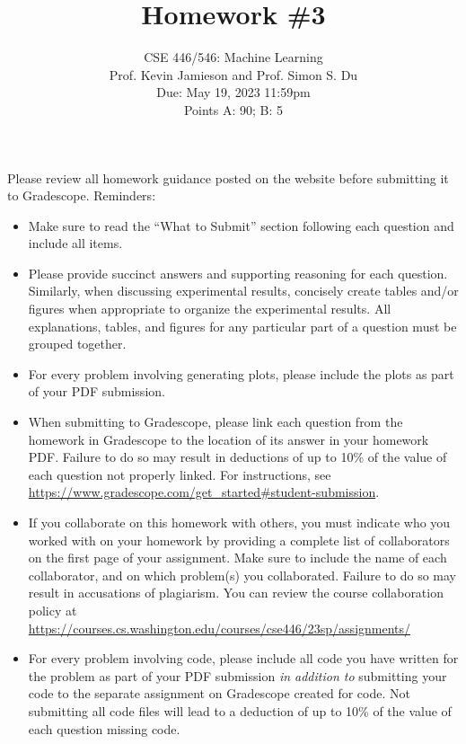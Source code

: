 \documentclass{article}
\begin{document}
\setcounter{aprob}{0}
\title{Homework \#3}
\author{
    \normalsize{CSE 446/546: Machine Learning}\\
    \normalsize{Prof. Kevin Jamieson and Prof. Simon S. Du}\\
    \normalsize{Due: May 19, 2023 11:59pm}\\
    \normalsize{Points A: 90; B: 5}
}
\date{{}}
\maketitle

\noindent Please review all homework guidance posted on the website before submitting it to Gradescope. Reminders:
\begin{itemize}
    \item Make sure to read the ``What to Submit'' section following each question and include all items.
    \item Please provide succinct answers and supporting reasoning for each question. Similarly, when discussing experimental results, concisely create tables and/or figures when appropriate to organize the experimental results. All explanations, tables, and figures for any particular part of a question must be grouped together.
    \item For every problem involving generating plots, please include the plots as part of your PDF submission.
    \item When submitting to Gradescope, please link each question from the homework in Gradescope to the location of its answer in your homework PDF. Failure to do so may result in deductions of up to 10\% of the value of each question not properly linked. For instructions, see \url{https://www.gradescope.com/get_started#student-submission}.
    \item If you collaborate on this homework with others, you must indicate who you worked with on your homework by providing a complete list of collaborators on the first page of your assignment. Make sure to include the name of each collaborator, and on which problem(s) you collaborated. Failure to do so may result in accusations of plagiarism. You can review the course collaboration policy at \url{https://courses.cs.washington.edu/courses/cse446/23sp/assignments/}
    \item For every problem involving code, please include all code you have written for the problem as part of your PDF submission \emph{in addition to} submitting your code to the separate assignment on Gradescope created for code. Not submitting all code files will lead to a deduction of up to 10\% of the value of each question missing code.  
\end{itemize}
\end{document}
